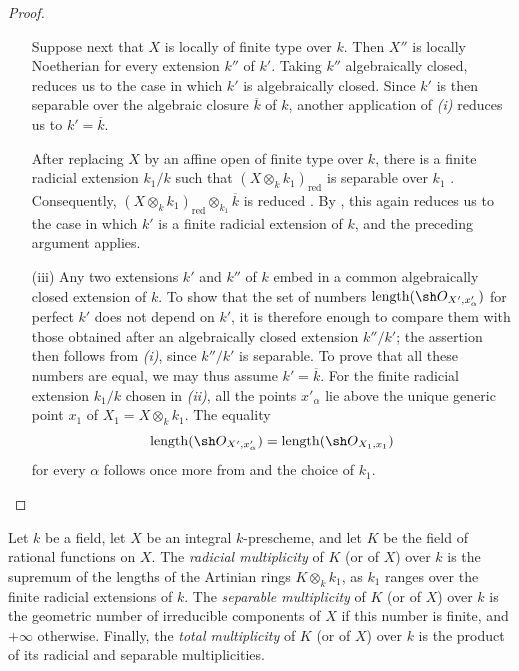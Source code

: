 \begin{proof}
\begin{enumerate}
Suppose next that $X$ is locally of finite type over $k$.
Then $X''$ is locally Noetherian for every extension $k''$ of $k'$.
Taking $k''$ algebraically closed,  reduces us to
the case in which $k'$ is algebraically closed.
Since $k'$ is then separable over the algebraic closure $\overline k$
of $k$, another application of \emph{(i)} reduces us to
$k'=\overline k$.


After replacing $X$ by an affine open of finite type over $k$, there
is a finite radicial extension $k_1/k$ such that
$(X\otimes_k k_1)_{\mathrm{red}}$ is separable over $k_1$
.
Consequently,
$(X\otimes_k k_1)_{\mathrm{red}}\otimes_{k_1}\overline k$ is reduced
.
By , this again reduces us to the case in which
$k'$ is a finite radicial extension of $k$, and the preceding
argument applies.

\item[\rm(iii)]
Any two extensions $k'$ and $k''$ of $k$ embed in a common
algebraically closed extension of $k$.
To show that the set of numbers
$\operatorname{length}(\sh O_{X',x'_\alpha})$ for perfect $k'$ does
not depend on $k'$, it is therefore enough to compare them with those
obtained after an algebraically closed extension $k''/k'$; the
assertion then follows from \emph{(i)}, since $k''/k'$ is separable.
To prove that all these numbers are equal, we may thus assume
$k'=\overline k$.
For the finite radicial extension $k_1/k$ chosen in \emph{(ii)}, all
the points $x'_\alpha$ lie above the unique generic point $x_1$ of
$X_1=X\otimes_k k_1$.
The equality
\[
\operatorname{length}(\sh O_{X',x'_\alpha})
=\operatorname{length}(\sh O_{X_1,x_1})
\]
for every $\alpha$ follows once more from  and the
choice of $k_1$.
\end{enumerate}
\end{proof}

\begin{definition}[4.7.4]
\label{IV.4.7.4}
Let $k$ be a field, let $X$ be an integral $k$-prescheme, and let $K$
be the field of rational functions on $X$.
The \emph{radicial multiplicity} of $K$ (or of $X$) over $k$ is the
supremum of the lengths of the Artinian rings $K\otimes_k k_1$, as
$k_1$ ranges over the finite radicial extensions of $k$.
The \emph{separable multiplicity} of $K$ (or of $X$) over $k$ is the
geometric number of irreducible components of $X$ if this number is
finite, and $+\infty$ otherwise.
Finally, the \emph{total multiplicity} of $K$ (or of $X$) over $k$ is
the product of its radicial and separable multiplicities.
\end{definition}

